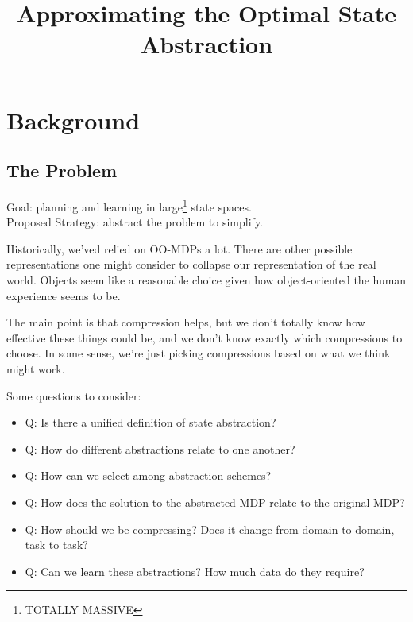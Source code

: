 \documentclass[11pt]{amsart}
\title{Approximating the Optimal State Abstraction}
\author{}
\date{}                                           %
\begin{document}
\maketitle

\begin{abstract}

\end{abstract}

\newpage
\section{Background}

\subsection{The Problem}
\begin{mdframed}
\vspace{1mm}
Goal: planning and learning in large\footnote{TOTALLY MASSIVE} state spaces. \\
Proposed Strategy: abstract the problem to simplify.
\end{mdframed}

\vspace{4mm}
Historically, we'ved relied on OO-MDPs a lot. There are other possible representations one might consider to collapse our representation of the real world. Objects seem like a reasonable choice given how object-oriented the human experience seems to be.


The main point is that compression helps, but we don't totally know how effective these things could be, and we don't know exactly which compressions to choose. In some sense, we're just picking compressions based on what we think might work.

Some questions to consider:
\begin{itemize}
\item Q: Is there a unified definition of state abstraction?
\item Q: How do different abstractions relate to one another?
\item Q: How can we select among abstraction schemes?
\item Q: How does the solution to the abstracted MDP relate to the original MDP?
\item Q: How should we be compressing? Does it change from domain to domain, task to task?
\item Q: Can we learn these abstractions? How much data do they require?
\end{itemize}
\end{document}
